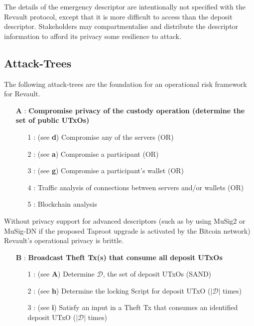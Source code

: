 \documentclass[runningheads]{llncs}
\begin{document}
\noindent The details of the emergency descriptor are intentionally not specified with the Revault protocol, except that it is more difficult to access than the deposit descriptor. Stakeholders may compartmentalise and distribute the descriptor information to afford its privacy some resilience to attack. 


\subsection{Attack-Trees}
\label{subsec:attck-trees}

The following attack-trees are the foundation for an operational risk framework for Revault.

{\footnotesize
\begin{itemize}[noitemsep,parsep=0pt,partopsep=0pt, leftmargin=0.7cm]
\item[\textbf{A} :] \textbf{Compromise privacy of the custody operation (determine the set of public UTxOs)}
\begin{itemize}[noitemsep,topsep=0pt,parsep=0pt,partopsep=0pt, leftmargin=0.8cm]
\item[1 :] (see \textbf{d}) Compromise any of the servers (OR)
\item[2 :] (see \textbf{a}) Compromise a participant (OR)
\item[3 :] (see \textbf{g}) Compromise a participant's wallet (OR)
\item[4 :] Traffic analysis of connections between servers and/or wallets (OR)
\item[5 :] Blockchain analysis
\end{itemize}
\end{itemize}
}

\noindent Without privacy support for advanced descriptors (such as by using MuSig2 \cite{MuSig2} or MuSig-DN \cite{MuSig-DN} if the proposed Taproot \cite{Taproot} upgrade is activated by the Bitcoin network) Revault's operational privacy is brittle. 

{\footnotesize
\begin{itemize}[noitemsep,parsep=0pt,partopsep=0pt, leftmargin=0.7cm]
\item[\textbf{B} :] \textbf{Broadcast Theft Tx(s) that consume all deposit UTxOs}
\begin{itemize}[noitemsep,topsep=0pt,parsep=0pt,partopsep=0pt, leftmargin=0.8cm]
\item[1 :] (see \textbf{A}) Determine $\mathcal{D}$, the set of deposit UTxOs (SAND)
\item[2 :] (see \textbf{h}) Determine the locking Script for deposit UTxO ($|\mathcal{D}|$ times)
\item[3 :] (see \textbf{i}) Satisfy an input in a Theft Tx that consumes an identified deposit UTxO ($|\mathcal{D}|$ times) 
\end{itemize}
\end{itemize}
}
\end{document}
